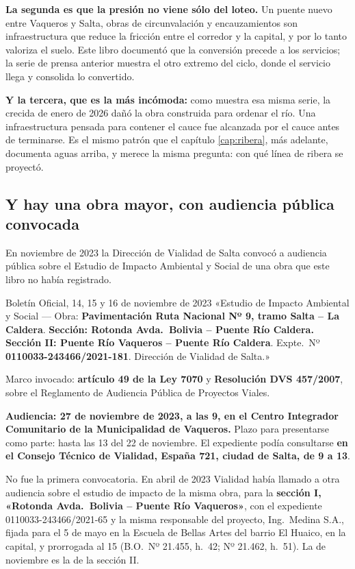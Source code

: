 \textbf{La segunda es que la presión no viene sólo del loteo.} Un puente nuevo entre Vaqueros y Salta, obras de circunvalación y encauzamientos son infraestructura que reduce la fricción entre el corredor y la capital, y por lo tanto valoriza el suelo. Este libro documentó que la conversión precede a los servicios; la serie de prensa anterior muestra el otro extremo del ciclo, donde el servicio llega y consolida lo convertido.

\textbf{Y la tercera, que es la más incómoda:} como muestra esa misma serie, la crecida de enero de 2026 dañó la obra construida para ordenar el río. Una infraestructura pensada para contener el cauce fue alcanzada por el cauce antes de terminarse. Es el mismo patrón que el capítulo \ref{cap:ribera}, más adelante, documenta aguas arriba, y merece la misma pregunta: con qué línea de ribera se proyectó.


\subsection*{Y hay una obra mayor, con audiencia pública convocada}

En noviembre de 2023 la Dirección de Vialidad de Salta convocó a audiencia pública sobre el
Estudio de Impacto Ambiental y Social de una obra que este libro no había registrado.

\begin{ficha}{Boletín Oficial, 14, 15 y 16 de noviembre de 2023}
«Estudio de Impacto Ambiental y Social --- Obra: \textbf{Pavimentación Ruta Nacional Nº 9,
tramo Salta -- La Caldera}. \textbf{Sección: Rotonda Avda.\ Bolivia -- Puente Río Caldera.
Sección II: Puente Río Vaqueros -- Puente Río Caldera}. Expte.\ Nº
\textbf{0110033-243466/2021-181}. Dirección de Vialidad de Salta.»

Marco invocado: \textbf{artículo 49 de la Ley 7070} y \textbf{Resolución DVS 457/2007}, sobre
el Reglamento de Audiencia Pública de Proyectos Viales.

\textbf{Audiencia: 27 de noviembre de 2023, a las 9, en el Centro Integrador Comunitario de la
Municipalidad de Vaqueros.} Plazo para presentarse como parte: hasta las 13 del 22 de noviembre.
El expediente podía consultarse \textbf{en el Consejo Técnico de Vialidad, España 721, ciudad
de Salta, de 9 a 13}.
\end{ficha}

No fue la primera convocatoria. En abril de 2023 Vialidad había llamado a otra audiencia sobre el estudio de impacto de la misma obra, para la \textbf{sección I, «Rotonda Avda.\ Bolivia -- Puente Río Vaqueros»}, con el expediente 0110033-243466/2021-65 y la misma responsable del proyecto, Ing.\ Medina S.A., fijada para el 5 de mayo en la Escuela de Bellas Artes del barrio El Huaico, en la capital, y prorrogada al 15 (B.O.\ Nº 21.455, h.\ 42; Nº 21.462, h.\ 51). La de noviembre es la de la sección II.

